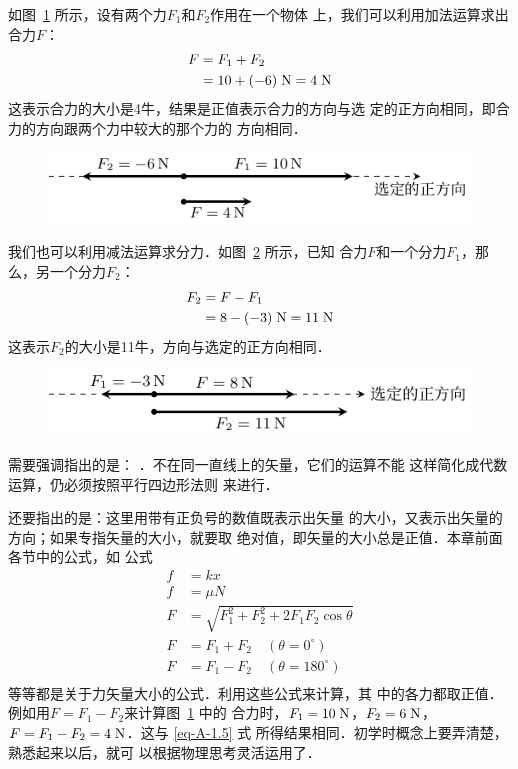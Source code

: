     如图~\ref{fig_A_1-34} 所示，设有两个力$F_1$和$F_2$作用在一个物体
上，我们可以利用加法运算求出合力$F$：
\begin{equation}\label{eq-A-1.5}
\begin{split} 
F&=F_1+F_2\\
&=10+(-6) \;\text{N} =4 \;\text{N}
\end{split} 
\end{equation} 
这表示合力的大小是4牛，结果是正值表示合力的方向与选
定的正方向相同，即合力的方向跟两个力中较大的那个力的
方向相同．

\begin{figure}[htbp]
    \centering
    \includegraphics{fig/A/1-34.pdf} 
    \caption{} \label{fig_A_1-34} 
\end{figure} 

    我们也可以利用减法运算求分力．如图~\ref{fig_A_1-35} 所示，已知
合力$F$和一个分力$F_1$，那么，另一个分力$F_2$：
\begin{equation} 
\begin{split} 
F_2&=F-F_1\\
&=8-(-3) \;\text{N} =11 \;\text{N}
\end{split} 
\end{equation} 
这表示$F_2$的大小是11牛，方向与选定的正方向相同．

\begin{figure}[htbp]
	\centering
	\includegraphics{fig/A/1-35.pdf} 
	\caption{} \label{fig_A_1-35} 
\end{figure} 

需要强调指出的是： ．不在同一直线上的矢量，它们的运算不能
这样简化成代数运算，仍必须按照平行四边形法则
来进行．



    还要指出的是：这里用带有正负号的数值既表示出矢量
的大小，又表示出矢量的方向；如果专指矢量的大小，就要取
绝对值，即矢量的大小总是正值．本章前面各节中的公式，如
公式
\[\begin{split} 
f&=kx\\
f&=\mu N\\
F&=\sqrt{F^2_1+F^2_2+2F_1F_2\cos\theta} \\
F&=F_1+F_2\quad (\theta =0^\circ)\\
F&=F_1-F_2\quad (\theta =180^\circ)\\
\end{split}  \]
等等都是关于力矢量大小的公式．利用这些公式来计算，其
中的各力都取正值．例如用$F=F_1-F_2$来计算图~\ref{fig_A_1-34} 中的
合力时，$F_1=10 \;\text{N} $，$F_2=6 \;\text{N} $，$F=F_1-F_2=4 \;\text{N} $．这与 \eqref{eq-A-1.5} 式
所得结果相同．初学时概念上要弄清楚，熟悉起来以后，就可
以根据物理思考灵活运用了．


